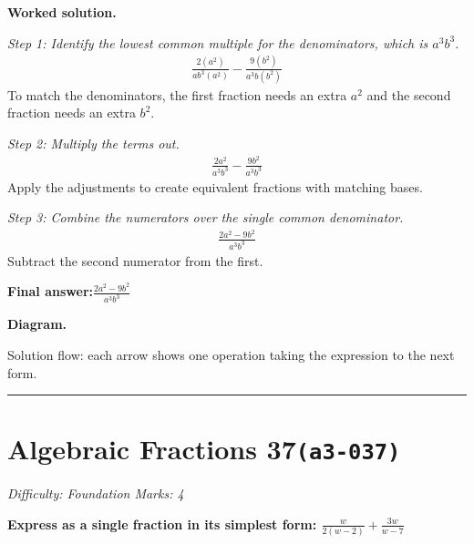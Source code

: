 \documentclass[11pt]{article}
\newcommand{\question}[1]{\par\medskip\noindent\textbf{#1}\par}
\begin{document}
\textbf{Worked solution.}

\textit{Step 1: Identify the lowest common multiple for the denominators, which is \( a^3b^3 \).}
\[\begin{gathered}
\frac{2(a^2)}{ab^3(a^2)} - \frac{9(b^2)}{a^3b(b^2)}
\end{gathered}\]
To match the denominators, the first fraction needs an extra \( a^2 \) and the second fraction needs an extra \( b^2 \).

\textit{Step 2: Multiply the terms out.}
\[\begin{gathered}
\frac{2a^2}{a^3b^3} - \frac{9b^2}{a^3b^3}
\end{gathered}\]
Apply the adjustments to create equivalent fractions with matching bases.

\textit{Step 3: Combine the numerators over the single common denominator.}
\[\begin{gathered}
\frac{2a^2 - 9b^2}{a^3b^3}
\end{gathered}\]
Subtract the second numerator from the first.

\begin{answerbox}
\textbf{Final answer:}\quad \(\displaystyle \frac{2a^2 - 9b^2}{a^3b^3}\)
\end{answerbox}
\textbf{Diagram.}

\begin{center}
\end{center}
\small Solution flow: each arrow shows one operation taking the expression to the next form.\normalsize

\medskip\hrule

\section*{Algebraic Fractions 37\quad\small\texttt{(a3-037)}}
\textit{Difficulty: Foundation \quad\textbar\quad Marks: 4}

\question{Express as a single fraction in its simplest form: \( \frac{w}{2(w-2)} + \frac{3w}{w-7} \)}
\end{document}
